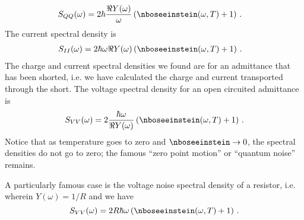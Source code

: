 \begin{align}
  S_{QQ}(\omega)
  &= 2 \hbar \frac{\Re Y(\omega)}{\omega} \left( \nboseeinstein(\omega, T) + 1 \right)
  \, .
\end{align}
The current spectral density is
\begin{align}
S_{II}(\omega)
  &= 2 \hbar \omega \Re Y(\omega) \left( \nboseeinstein(\omega, T) + 1 \right)
  \, .
\end{align}
The charge and current spectral densities we found are for an admittance that has been shorted, i.e. we have calculated the charge and current transported through the short.
The voltage spectral density for an open circuited admittance is
\begin{equation}
  S_{VV}(\omega) = 2 \frac{\hbar \omega}{\Re Y(\omega)} \left( \nboseeinstein(\omega, T) + 1 \right)
  \, .
\end{equation}
Notice that as temperature goes to zero and $\nboseeinstein \rightarrow 0$, the spectral densities do not go to zero; the famous ``zero point motion'' or ``quantum noise'' remains.

A particularly famous case is the voltage noise spectral density of a resistor, i.e. wherein $Y(\omega) = 1 / R$ and we have
\begin{equation}
  S_{VV}(\omega) = 2 R \hbar \omega \left( \nboseeinstein(\omega, T) + 1 \right) \, .
\end{equation}
